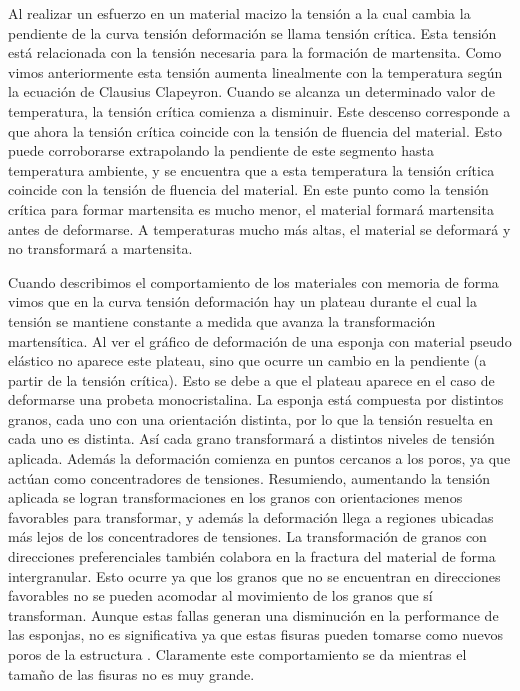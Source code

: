 \documentclass[a4paper,12pt,fleqn,twoside,openany]{book}
\begin{document}
Al realizar un esfuerzo en un material macizo la tensión a la cual cambia la pendiente de la curva tensión deformación se llama tensión crítica. Esta 
tensión está relacionada con la tensión necesaria para la formación de martensita. Como vimos anteriormente esta tensión aumenta linealmente con la temperatura según la 
ecuación de Clausius Clapeyron. Cuando se alcanza un determinado valor de temperatura, la tensión crítica comienza a disminuir. Este descenso corresponde a que ahora la tensión crítica 
coincide con la tensión de fluencia del material. Esto puede corroborarse extrapolando la pendiente de este segmento hasta temperatura ambiente, y se encuentra que a esta 
temperatura la tensión crítica coincide con la tensión de fluencia del material. En este punto como la tensión crítica para formar martensita es mucho menor, el 
material formará martensita antes de deformarse. A temperaturas mucho más altas, el material se deformará y no transformará a martensita.

Cuando describimos el comportamiento de los materiales con memoria de forma vimos que en la curva tensión deformación hay un plateau durante el cual la tensión se 
mantiene constante a medida que avanza la transformación martensítica. Al ver el gráfico de deformación de una esponja con material pseudo elástico no aparece este plateau, 
sino que ocurre un cambio en la pendiente (a partir de la tensión crítica). Esto se debe a que el plateau aparece en el caso de deformarse una probeta monocristalina. 
La esponja está compuesta por distintos granos, cada uno con una orientación distinta, por lo que la tensión resuelta en cada uno es distinta. Así cada grano transformará 
a distintos niveles de tensión aplicada. Además la deformación comienza en puntos cercanos a los poros, ya que actúan como concentradores de tensiones. Resumiendo, 
aumentando la tensión aplicada se logran transformaciones en los granos con orientaciones menos favorables para transformar, y además la deformación llega a regiones ubicadas más lejos 
de los concentradores de tensiones.
La transformación de granos con direcciones preferenciales también colabora en la fractura del material de forma intergranular. Esto ocurre ya que los granos que no se encuentran
en direcciones favorables no se pueden acomodar al movimiento de los granos que sí transforman. Aunque estas fallas generan una disminución en la performance de las esponjas,
no es significativa ya que estas fisuras pueden tomarse como nuevos poros de la estructura \cite{bertolino2010}. Claramente este comportamiento se da mientras el tamaño de las fisuras no es muy 
grande.
\end{document}

